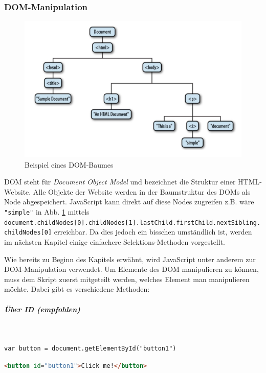 \documentclass[a4paper, 11pt]{article}
\newcommand{\code}[1]{\texttt{#1}}
\begin{document}
\subsubsection{DOM-Manipulation}
\begin{figure}[htb]
	\centering
	\includegraphics[keepaspectratio=true,height=14\baselineskip]{DOM_structure.jpg}
	\caption{Beispiel eines DOM-Baumes}
	\label{fig:DOM}
\end{figure}
DOM steht für \textit{Document Object Model} und bezeichnet die Struktur einer HTML-Website. Alle Objekte der Website werden in der Baumstruktur des DOMs als Node abgespeichert. JavaScript kann direkt auf diese Nodes zugreifen z.B. wäre \code{"simple"} in Abb. \ref{fig:DOM} mittels \code{document.childNodes[0].childNodes[1].lastChild.firstChild.nextSibling.childNodes[0]} erreichbar. Da dies jedoch ein bisschen umständlich ist, werden im nächsten Kapitel einige einfachere Selektions-Methoden vorgestellt.


Wie bereits zu Beginn des Kapitels erwähnt, wird JavaScript unter anderem zur DOM-Manipulation verwendet. Um Elemente des DOM manipulieren zu können, muss dem Skript zuerst mitgeteilt werden, welches Element man manipulieren möchte. Dabei gibt es verschiedene Methoden:

\subparagraph{Über ID (empfohlen)}\mbox{}\\
\begin{lstlisting}
var button = document.getElementById("button1")
\end{lstlisting}

\begin{lstlisting}[language=html]
<button id="button1">Click me!</button>
\end{lstlisting}
\end{document}
